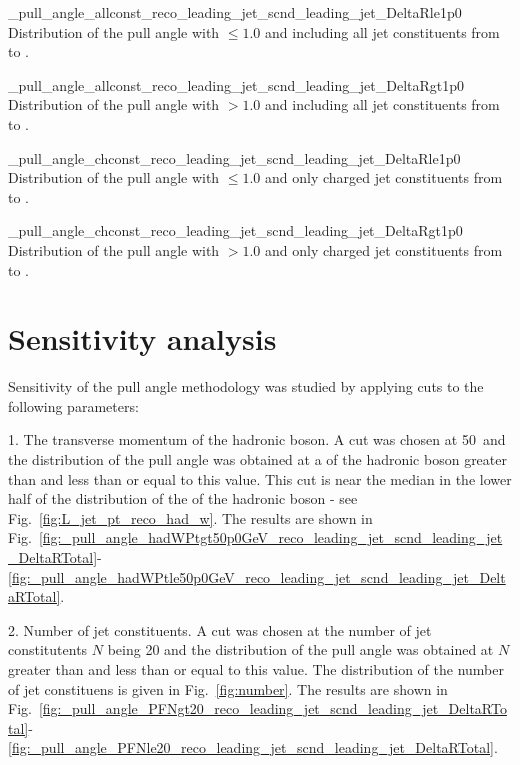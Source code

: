           {_pull_angle_allconst_reco_leading_jet_scnd_leading_jet_DeltaRle1p0}
          {Distribution of the pull angle with \DeltaR$\leq1.0$ and including all jet constituents from \leadingjet to \scndleadingjet.}

          {_pull_angle_allconst_reco_leading_jet_scnd_leading_jet_DeltaRgt1p0}
          {Distribution of the pull angle with \DeltaR$>1.0$ and including all jet constituents from \leadingjet to \scndleadingjet.}

          {_pull_angle_chconst_reco_leading_jet_scnd_leading_jet_DeltaRle1p0}
          {Distribution of the pull angle with \DeltaR$\leq1.0$ and only charged jet constituents from \leadingjet to \scndleadingjet.}

          {_pull_angle_chconst_reco_leading_jet_scnd_leading_jet_DeltaRgt1p0}
          {Distribution of the pull angle with \DeltaR$>1.0$ and only charged jet constituents from \leadingjet to \scndleadingjet.}


\section{Sensitivity analysis}

Sensitivity of the pull angle methodology was studied by applying cuts to the following parameters:

1. The transverse momentum \pt of the hadronic \PW boson. A cut was chosen at 50~\GeV and the distribution of the pull angle was obtained at a \pt of the hadronic \PW boson greater than and less than or equal to this value. This cut is near the median in the lower half of the distribution of the \pt of the hadronic \PW boson - see Fig.~\ref{fig:L_jet_pt_reco_had_w}. The results are shown in Fig.~\ref{fig:_pull_angle_hadWPtgt50p0GeV_reco_leading_jet_scnd_leading_jet_DeltaRTotal}-\ref{fig:_pull_angle_hadWPtle50p0GeV_reco_leading_jet_scnd_leading_jet_DeltaRTotal}.

2. Number of jet constituents. A cut was chosen at the number of jet constitutents $N$ being 20 and the distribution of the pull angle was obtained at $N$ greater than and less than or equal to this value. The distribution of the number of jet constituens is given in Fig.~\ref{fig:number}. The results are shown in Fig.~\ref{fig:_pull_angle_PFNgt20_reco_leading_jet_scnd_leading_jet_DeltaRTotal}-\ref{fig:_pull_angle_PFNle20_reco_leading_jet_scnd_leading_jet_DeltaRTotal}.
                                        
